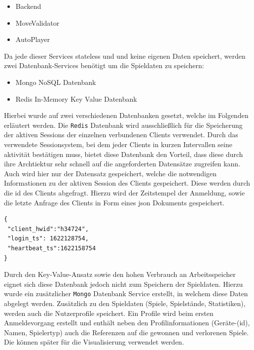 \begin{itemize}
\tightlist
\item
  Backend
\item
  MoveValidator
\item
  AutoPlayer
\end{itemize}

Da jede dieser Services stateless und und keine eigenen Daten speichert,
werden zwei Datenbank-Services benötigt um die Spieldaten zu speichern:

\begin{itemize}
\tightlist
\item
  Mongo NoSQL Datenbank
\item
  Redis In-Memory Key Value Datenbank
\end{itemize}

Hierbei wurde auf zwei verschiedenen Datenbanken gesetzt, welche im
Folgenden erläutert werden. Die \passthrough{\lstinline!Redis!}
\cite{redis} Datenbank wird ausschließlich für die Speicherung der
aktiven Sessions der einzelnen verbundenen Clients verwendet. Durch das
verwendete Sessionsystem, bei dem jeder Clients in kurzen Intervallen
seine aktivität bestätigen muss, bietet diese Datenbank den Vorteil,
dass diese durch ihre Archtiektur sehr schnell auf die angeforderten
Datensätze zugreifen kann. Auch wird hier nur der Datensatz gespeichert,
welche die notwendigen Informationen zu der aktiven Session des Clients
gespeichert. Diese werden durch die \gls{id} des Clients abgefragt.
Hierzu wird der Zeitstempel der Anmeldung, sowie die letzte Anfrage des
Clients in Form eines \gls{json} Dokuments gespeichert.

\begin{lstlisting}
{
 "client_hwid":"h34724",
 "login_ts": 1622128754,
 "heartbeat_ts":1622158754
}
\end{lstlisting}

Durch den Key-Value-Ansatz sowie den hohen Verbrauch an Arbeitsspeicher
eignet sich diese Datenbank jedoch nicht zum Speichern der Spieldaten.
Hierzu wurde ein zusätzlicher \passthrough{\lstinline!Mongo!}
\cite{mogodb} Datenbank Service erstellt, in welchem diese Daten
abgelegt werden. Zusätzlich zu den Spieldaten (Spiele, Spielstände,
Statistiken), werden auch die Nutzerprofile speichert. Ein Profile wird
beim ersten Anmeldevorgang erstellt und enthält neben den
Profilinformationen (Geräte-(id), Namen, Spielertyp) auch die Referenzen
auf die gewonnen und verlorenen Spiele. Die können später für die
Visualisierung verwendet werden.


